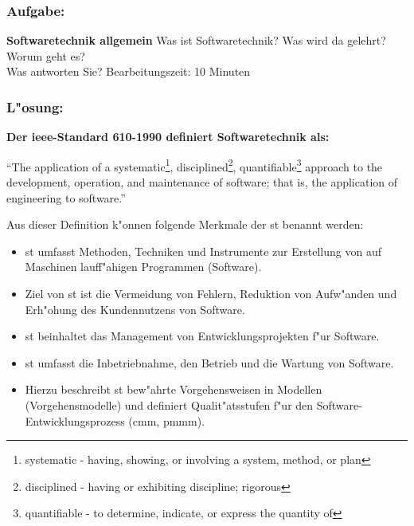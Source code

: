 \subsubsection*{Aufgabe:}

\begin{framed}
\textbf{Softwaretechnik allgemein}
\smallbreak
Was ist Softwaretechnik? Was wird da gelehrt? Worum geht es?
\\
Was antworten Sie?
\bigbreak
\small Bearbeitungszeit: 10 Minuten
\end{framed}
\bigbreak
\bigbreak
\subsubsection*{L"osung:}

\textbf{Der \gls{ieee}-Standard 610-1990 definiert Softwaretechnik als:}


\begin{center}
\enquote{The application of a  systematic\footnote{\label{foot:1}systematic - having, showing, or involving a system, method, or plan}, disciplined\footnote{\label{foot:2}disciplined - having or exhibiting discipline; rigorous}, quantifiable\footnote{\label{foot:3}quantifiable - to determine, indicate, or express the quantity of} approach to the development, operation, and maintenance of software; that is, the application of engineering to software.}
\end{center}

\bigbreak
\bigbreak

Aus dieser Definition k"onnen folgende Merkmale der \gls{st} benannt werden:
\bigbreak
\begin{itemize}
\item \gls{st} umfasst Methoden, Techniken und Instrumente zur Erstellung von auf Maschinen lauff"ahigen Programmen (Software).
\item Ziel von \gls{st} ist die Vermeidung von Fehlern, Reduktion von Aufw"anden und Erh"ohung des Kundennutzens von Software.
\item \gls{st} beinhaltet das Management von Entwicklungsprojekten f"ur Software.
\item \gls{st} umfasst die Inbetriebnahme, den Betrieb und die Wartung von Software.
\item Hierzu beschreibt \gls{st} bew"ahrte Vorgehensweisen in Modellen (Vorgehensmodelle) und definiert Qualit"atsstufen f"ur den Software-Entwicklungsprozess (\gls{cmm}, \gls{pmmm}).
\end{itemize}

